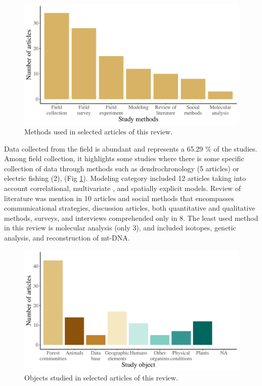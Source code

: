 \documentclass[]{article}
\begin{document}
\begin{figure}
\centering
\includegraphics{Review_and_climate_files/figure-latex/Methods-1.pdf}
\caption{\label{fig:Methods}Methods used in selected articles of this review.}
\end{figure}

Data collected from the field is abundant and represents a 65.29 \% of the studies. Among field collection, it highlights some studies where there is some specific collection of data through methods such as dendrochronology (5 articles) or electric fishing (2), (Fig \ref{fig:Methods}).
Modeling category included 12 articles taking into account correlational, multivariate , and spatially explicit models.
Review of literature was mention in 10 articles and social methods that encompasses communicational strategies, discussion articles, both quantitative and qualitative methods, surveys, and interviews comprehended only in 8.
The least used method in this review is molecular analysis (only 3), and included isotopes, genetic analysis, and reconstruction of mt-DNA.

\begin{figure}
\centering
\includegraphics{Review_and_climate_files/figure-latex/Objects-1.pdf}
\caption{\label{fig:Objects}Objects studied in selected articles of this review.}
\end{figure}
\end{document}

